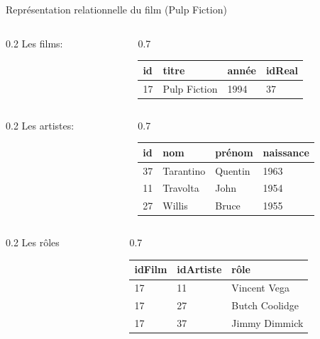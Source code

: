 \begin{frame}{Représentation relationnelle du film (Pulp Fiction)}

\begin{columns}
    \begin{column}{0.2\textwidth}
Les films:
\end{column}
  \begin{column}{0.7\textwidth}
   \begin{tabular}[!ht]{l|l|l|l}
      id & titre & année & idReal\\
     \hline
    17 & Pulp Fiction & 1994 & 37\\
     \hline
   \end{tabular}
   \end{column}
   \end{columns}
   
\bigskip

\begin{columns}
    \begin{column}{0.2\textwidth}
Les artistes: 
\end{column}
  \begin{column}{0.7\textwidth}

   \begin{tabular}[!ht]{l|l|l|l}
    id & nom & prénom & naissance\\
     \hline
    37 & Tarantino & Quentin & 1963\\
    11 & Travolta & John & 1954\\
    27 & Willis & Bruce & 1955\\
     \hline
   \end{tabular}
\end{column}
\end{columns}

  \bigskip

\begin{columns}
    \begin{column}{0.2\textwidth}
Les rôles
\end{column}
  \begin{column}{0.7\textwidth}

   \begin{tabular}[!ht]{l|l|l}
    idFilm & idArtiste & rôle\\
     \hline
    17 & 11 & Vincent Vega \\
    17 & 27 & Butch Coolidge\\
   17 & 37 & Jimmy Dimmick\\
     \hline
   \end{tabular}
  \end{column}
\end{columns}

\end{frame} %


